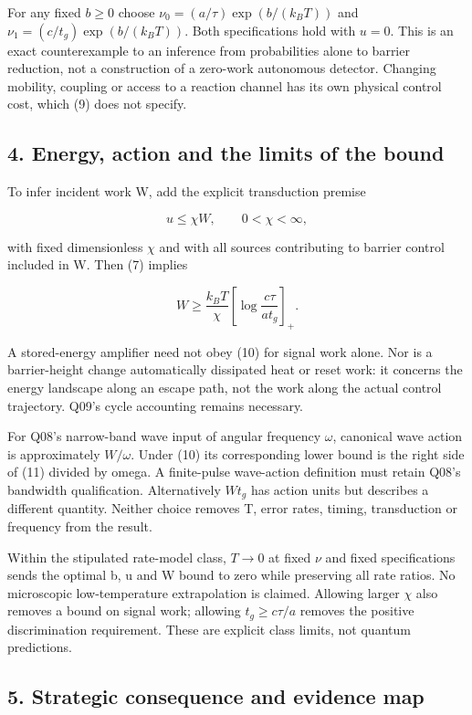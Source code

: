 \documentclass[11pt,a4paper]{article}
\begin{document}
For any fixed \(b\ge0\) choose \(\nu_0=(a/\tau)\exp(b/(k_BT))\) and
\(\nu_1=(c/t_g)\exp(b/(k_BT))\). Both specifications hold with \(u=0\).
This is an exact counterexample to an inference from probabilities alone
to barrier reduction, not a construction of a zero-work autonomous
detector. Changing mobility, coupling or access to a reaction channel
has its own physical control cost, which (9) does not specify.

\hypertarget{energy-action-and-the-limits-of-the-bound}{%
\subsection{4. Energy, action and the limits of the
bound}\label{energy-action-and-the-limits-of-the-bound}}

To infer incident work W, add the explicit transduction premise

\[u\le\chi W,\qquad 0<\chi<\infty, \tag{10}\]

with fixed dimensionless \(\chi\) and with all sources contributing to
barrier control included in W. Then (7) implies

\[W\ge\frac{k_BT}{\chi}
 \left[\log\frac{c\tau}{a t_g}\right]_+. \tag{11}\]

A stored-energy amplifier need not obey (10) for signal work alone. Nor
is a barrier-height change automatically dissipated heat or reset work:
it concerns the energy landscape along an escape path, not the work
along the actual control trajectory. Q09's cycle accounting remains
necessary.

For Q08's narrow-band wave input of angular frequency \(\omega\),
canonical wave action is approximately \(W/\omega\). Under (10) its
corresponding lower bound is the right side of (11) divided by omega. A
finite-pulse wave-action definition must retain Q08's bandwidth
qualification. Alternatively \(Wt_g\) has action units but describes a
different quantity. Neither choice removes T, error rates, timing,
transduction or frequency from the result.

Within the stipulated rate-model class, \(T\to0\) at fixed \(\nu\) and
fixed specifications sends the optimal b, u and W bound to zero while
preserving all rate ratios. No microscopic low-temperature extrapolation
is claimed. Allowing larger \(\chi\) also removes a bound on signal
work; allowing \(t_g\ge c\tau/a\) removes the positive discrimination
requirement. These are explicit class limits, not quantum predictions.

\hypertarget{strategic-consequence-and-evidence-map}{%
\subsection{5. Strategic consequence and evidence
map}\label{strategic-consequence-and-evidence-map}}
\end{document}
